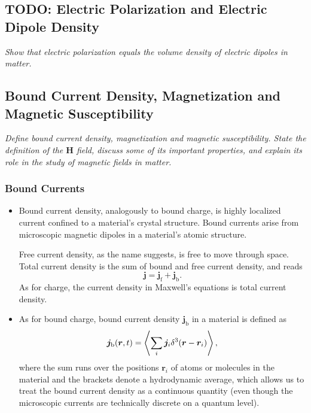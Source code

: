 \documentclass[11pt, a4paper]{article}
\renewcommand{\vec}[1]{\bm{#1}} %
\renewcommand{\r}{\vec{r}}
\renewcommand{\H}{\vec{H}}  %
\renewcommand{\j}{\vec{j}}  %
\begin{document}
    
\subsection{TODO: Electric Polarization and Electric Dipole Density}
\textit{Show that electric polarization equals the volume density of electric dipoles in matter.}
    
\subsection{Bound Current Density, Magnetization and Magnetic Susceptibility}
\textit{Define bound current density, magnetization and magnetic susceptibility. State the definition of the $ \H $ field, discuss some of its important properties, and explain its role in the study of magnetic fields in matter.}

\subsubsection{Bound Currents}
\begin{itemize}

    \item Bound current density, analogously to bound charge, is highly localized current confined to a material's crystal structure. Bound currents arise from microscopic magnetic dipoles in a material's atomic structure. 

    Free current density, as the name suggests, is free to move through space. Total current density is the sum of bound and free current density, and reads
    \begin{equation*}
        \j = \j_{\text{f}} + \j_{\text{b}}.
    \end{equation*}
    As for charge, the current density in Maxwell's equations is total current density.


	\item As for bound charge, bound current density $ \j_{\text{b}} $ in a material is defined as
	\begin{equation*}
		\j_{\text{b}}(\r, t) = \ev{\sum_{i}\j_{i}\delta^{3}(\r - \r_{i})},
	\end{equation*}
    where the sum runs over the positions $ \r_{i} $ of atoms or molecules in the material and the brackets denote a hydrodynamic average, which allows us to treat the bound current density as a continuous quantity (even though the microscopic currents are technically discrete on a quantum level).

\end{itemize}
\end{document}
